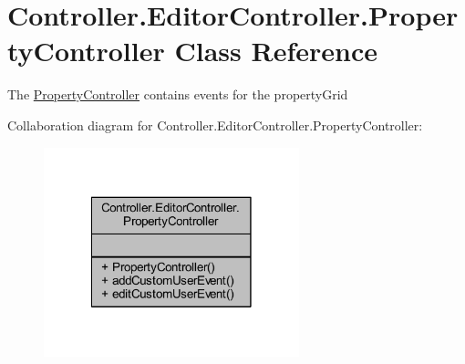 \hypertarget{class_controller_1_1_editor_controller_1_1_property_controller}{\section{Controller.\-Editor\-Controller.\-Property\-Controller Class Reference}
\label{class_controller_1_1_editor_controller_1_1_property_controller}
}


The \hyperlink{class_controller_1_1_editor_controller_1_1_property_controller}{Property\-Controller} contains events for the property\-Grid  




Collaboration diagram for Controller.\-Editor\-Controller.\-Property\-Controller\-:
\nopagebreak
\begin{figure}[H]
\begin{center}
\leavevmode
\includegraphics[width=210pt]{class_controller_1_1_editor_controller_1_1_property_controller__coll__graph}
\end{center}
\end{figure}

